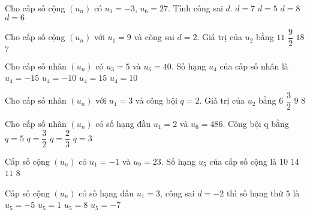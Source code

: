 \begin{ex}
Cho cấp số cộng $(u_n)$ có $u_1=-3$, $u_6=27$. Tính công sai $d$.
\choice
{$d=7$}
{$d=5$}
{$d=8$}
{\True $d=6$}
\end{ex}
\begin{ex}
Cho cấp số cộng $(u_n)$ với $u_1=9$ và công sai $d=2$. Giá trị của $u_2$ bằng
\choice
{\True $11$}
{$\dfrac{9}{2}$}
{$18$}
{$7$}
\end{ex}
\begin{ex}
Cho cấp số nhân $(u_n)$ có $u_3=5$ và $u_6=40$. Số hạng $u_4$ của cấp số nhân là
\choice
{$u_4=-15$}
{$u_4=-10$}
{$u_4=15$}
{\True $u_4=10$}
\end{ex}
\begin{ex}
Cho cấp số nhân $(u_n)$ với $u_1=3$ và công bội $q=2$. Giá trị của $u_2$ bằng
\choice
{\True $6$}
{$\dfrac{3}{2}$}
{$9$}
{$8$}
\end{ex}
\begin{ex}
Cho cấp số nhân $(u_n)$ có số hạng đầu $u_1=2$ và $u_6=486$. Công bội q bằng
\choice
{$q=5$}
{$q=\dfrac{3}{2}$}
{$q=\dfrac{2}{3}$}
{\True $q=3$}
\end{ex}
\begin{ex}
Cấp số cộng $(u_n)$ có $u_1=-1$ và $u_9=23$. Số hạng $u_5$ của cấp số cộng là
\choice
{$10$}
{$14$}
{\True $11$}
{$8$}
\end{ex}
\begin{ex}
Cấp số cộng $(u_n)$ có số hạng đầu $u_1=3$, công sai $d=-2$ thì số hạng thứ $5$ là
\choice
{\True $u_5=-5$}
{$u_5=1$}
{$u_5=8$}
{$u_5=-7$}
\end{ex}
